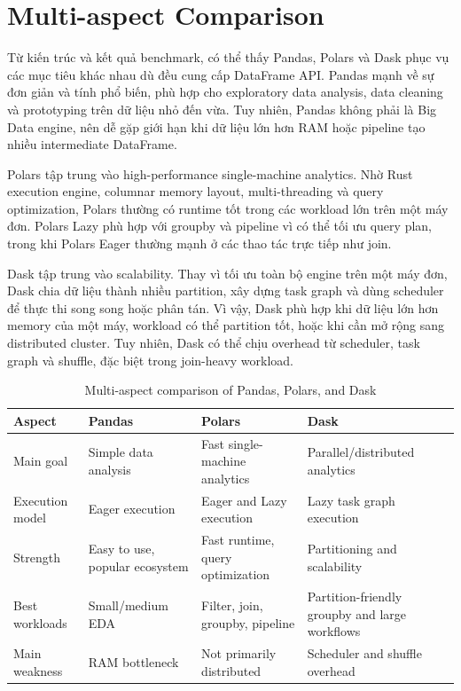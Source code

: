 \documentclass[12pt,a4paper]{article}
\begin{document}
\section{Multi-aspect Comparison}

Từ kiến trúc và kết quả benchmark, có thể thấy Pandas, Polars và Dask phục vụ các mục tiêu khác nhau dù đều cung cấp DataFrame API. Pandas mạnh về sự đơn giản và tính phổ biến, phù hợp cho exploratory data analysis, data cleaning và prototyping trên dữ liệu nhỏ đến vừa. Tuy nhiên, Pandas không phải là Big Data engine, nên dễ gặp giới hạn khi dữ liệu lớn hơn RAM hoặc pipeline tạo nhiều intermediate DataFrame.

Polars tập trung vào high-performance single-machine analytics. Nhờ Rust execution engine, columnar memory layout, multi-threading và query optimization, Polars thường có runtime tốt trong các workload lớn trên một máy đơn. Polars Lazy phù hợp với groupby và pipeline vì có thể tối ưu query plan, trong khi Polars Eager thường mạnh ở các thao tác trực tiếp như join.

Dask tập trung vào scalability. Thay vì tối ưu toàn bộ engine trên một máy đơn, Dask chia dữ liệu thành nhiều partition, xây dựng task graph và dùng scheduler để thực thi song song hoặc phân tán. Vì vậy, Dask phù hợp khi dữ liệu lớn hơn memory của một máy, workload có thể partition tốt, hoặc khi cần mở rộng sang distributed cluster. Tuy nhiên, Dask có thể chịu overhead từ scheduler, task graph và shuffle, đặc biệt trong join-heavy workload.

\begin{table}[H]
\centering
\small
\renewcommand{\arraystretch}{1.15}
\caption{Multi-aspect comparison of Pandas, Polars, and Dask}
\begin{tabular}{|p{3cm}|p{3.5cm}|p{3.5cm}|p{3.5cm}|}
\hline
\textbf{Aspect} & \textbf{Pandas} & \textbf{Polars} & \textbf{Dask} \\
\hline
Main goal & Simple data analysis & Fast single-machine analytics & Parallel/distributed analytics \\
\hline
Execution model & Eager execution & Eager and Lazy execution & Lazy task graph execution \\
\hline
Strength & Easy to use, popular ecosystem & Fast runtime, query optimization & Partitioning and scalability \\
\hline
Best workloads & Small/medium EDA & Filter, join, groupby, pipeline & Partition-friendly groupby and large workflows \\
\hline
Main weakness & RAM bottleneck & Not primarily distributed & Scheduler and shuffle overhead \\
\hline
\end{tabular}
\end{table}
\end{document}
